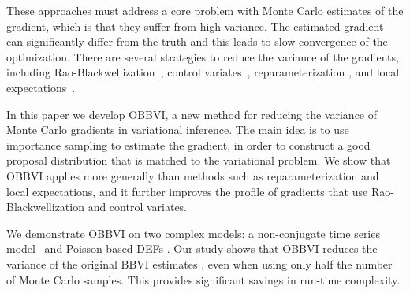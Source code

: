 \documentclass[]{article}
\begin{document}




These approaches must address a core problem with Monte Carlo
estimates of the gradient, which is that they suffer from high
variance. The estimated gradient can significantly differ from the
truth and this leads to slow convergence of the optimization. There
are several strategies to reduce the variance of the gradients,
including Rao-Blackwellization~\citep{Casella1996,Ranganath2014},
control variates~\citep{Ross2002,Paisley2012,Ranganath2014,Gu2016},
reparameterization
\citep{Price1958,Bonnet1964,Salimans2013,Kingma2014,Rezende2014,Kucukelbir2015},
and local expectations~\citep{Titsias2015}.

In this paper we develop \gls{OBBVI}, a new method for reducing the
variance of Monte Carlo gradients in variational inference.  The main
idea is to use importance sampling to estimate the gradient, in order
to construct a good proposal distribution that is matched to the
variational problem. We show that \gls{OBBVI} applies more
generally than methods such as reparameterization and local
expectations, and it further improves the profile of gradients that
use Rao-Blackwellization and control variates.

%
%

We demonstrate \gls{OBBVI} on two complex models: a non-conjugate
time series model~\citep{Ranganath2014} and Poisson-based \glspl{DEF}
\citep{Ranganath2015}. Our study shows that \gls{OBBVI} reduces the
variance of the original \gls{BBVI} estimates \citep{Ranganath2014},
even when using only half the number of Monte Carlo samples. This
provides significant savings in run-time complexity.

% 

\end{document}
